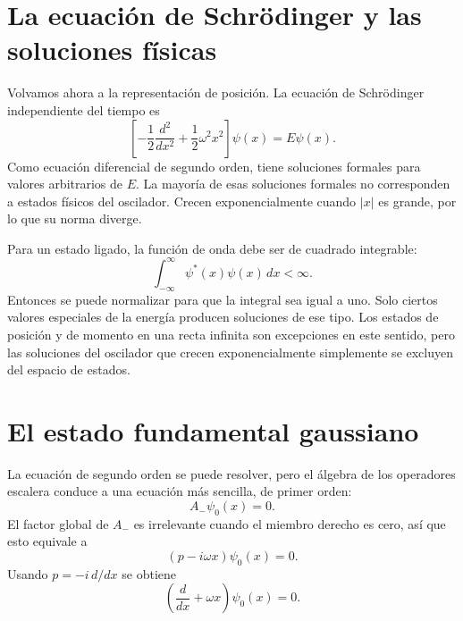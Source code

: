 \begin{classroomqa}
\end{classroomqa}

\section{La ecuación de Schr\"odinger y las soluciones físicas}

Volvamos ahora a la representación de posición. La ecuación de Schr\"odinger independiente del tiempo es
\begin{equation}
\left[
-\frac12\frac{d^{2}}{dx^{2}}
+\frac12\omega^{2}x^{2}
\right]\psi(x)=E\psi(x).
\end{equation}
Como ecuación diferencial de segundo orden, tiene soluciones formales para valores arbitrarios de \(E\). La mayoría de esas soluciones formales no corresponden a estados físicos del oscilador. Crecen exponencialmente cuando \(\lvert x\rvert\) es grande, por lo que su norma diverge.

Para un estado ligado, la función de onda debe ser de cuadrado integrable:
\begin{equation}
\int_{-\infty}^{\infty}\psi^{*}(x)\psi(x)\,dx<\infty.
\end{equation}
Entonces se puede normalizar para que la integral sea igual a uno. Solo ciertos valores especiales de la energía producen soluciones de ese tipo. Los estados de posición y de momento en una recta infinita son excepciones en este sentido, pero las soluciones del oscilador que crecen exponencialmente simplemente se excluyen del espacio de estados.

\section{El estado fundamental gaussiano}

La ecuación de segundo orden se puede resolver, pero el álgebra de los operadores escalera conduce a una ecuación más sencilla, de primer orden:
\begin{equation}
A_{-}\psi_{0}(x)=0.
\end{equation}
El factor global de \(A_{-}\) es irrelevante cuando el miembro derecho es cero, así que esto equivale a
\begin{equation}
(p-i\omega x)\psi_{0}(x)=0.
\end{equation}
Usando \(p=-i\,d/dx\) se obtiene
\begin{equation}
\left(\frac{d}{dx}+\omega x\right)\psi_{0}(x)=0.
\end{equation}

